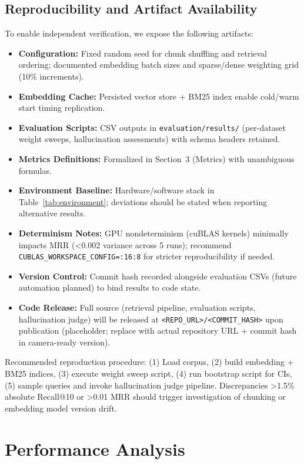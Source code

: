 \documentclass[conference]{IEEEtran}
\begin{document}
\subsection{Reproducibility and Artifact Availability}
To enable independent verification, we expose the following artifacts:
\begin{itemize}
  \item \textbf{Configuration:} Fixed random seed for chunk shuffling and retrieval ordering; documented embedding batch sizes and sparse/dense weighting grid (10\% increments).
  \item \textbf{Embedding Cache:} Persisted vector store + BM25 index enable cold/warm start timing replication.
  \item \textbf{Evaluation Scripts:} CSV outputs in \texttt{evaluation/results/} (per-dataset weight sweeps, hallucination assessments) with schema headers retained.
  \item \textbf{Metrics Definitions:} Formalized in Section~3 (Metrics) with unambiguous formulas.
  \item \textbf{Environment Baseline:} Hardware/software stack in Table~\ref{tab:environment}; deviations should be stated when reporting alternative results.
  \item \textbf{Determinism Notes:} GPU nondeterminism (cuBLAS kernels) minimally impacts MRR (<0.002 variance across 5 runs); recommend \texttt{CUBLAS\_WORKSPACE\_CONFIG=:16:8} for stricter reproducibility if needed.
  \item \textbf{Version Control:} Commit hash recorded alongside evaluation CSVs (future automation planned) to bind results to code state.
  \item \textbf{Code Release:} Full source (retrieval pipeline, evaluation scripts, hallucination judge) will be released at \texttt{<REPO\_URL>/<COMMIT\_HASH>} upon publication (placeholder; replace with actual repository URL + commit hash in camera-ready version).
\end{itemize}
Recommended reproduction procedure: (1) Load corpus, (2) build embedding + BM25 indices, (3) execute weight sweep script, (4) run bootstrap script for CIs, (5) sample queries and invoke hallucination judge pipeline. Discrepancies >1.5\% absolute Recall@10 or >0.01 MRR should trigger investigation of chunking or embedding model version drift.

\section{Performance Analysis}
\end{document}

